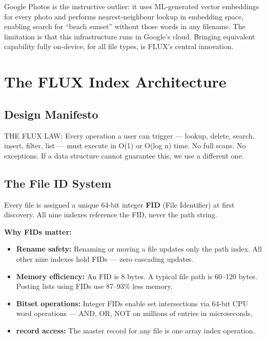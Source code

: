 Google Photos is the instructive outlier: it uses ML-generated vector embeddings for every photo and performs nearest-neighbour lookup in embedding space, enabling search for ``beach sunset'' without those words in any filename. The limitation is that this infrastructure runs in Google's cloud. Bringing equivalent capability fully on-device, for all file types, is FLUX's central innovation.

\chapter{The FLUX Index Architecture}

\section{Design Manifesto}

\begin{lawbox}
THE FLUX LAW: Every operation a user can trigger --- lookup, delete, search, insert, filter, list --- must execute in O(1) or O(log n) time. No full scans. No exceptions. If a data structure cannot guarantee this, we use a different one.
\end{lawbox}

\section{The File ID System}

Every file is assigned a unique 64-bit integer \textbf{FID} (File Identifier) at first discovery. All nine indexes reference the FID, never the path string.

\textbf{Why FIDs matter:}
\begin{itemize}
  \item \textbf{Rename safety:} Renaming or moving a file updates only the path index. All other nine indexes hold FIDs --- zero cascading updates.
  \item \textbf{Memory efficiency:} An FID is 8 bytes. A typical file path is 60--120 bytes. Posting lists using FIDs use 87--93\% less memory.
  \item \textbf{Bitset operations:} Integer FIDs enable set intersections via 64-bit CPU word operations --- AND, OR, NOT on millions of entries in microseconds.
  \item \textbf{ record access:} The master record for any file is one array index operation.
\end{itemize}

